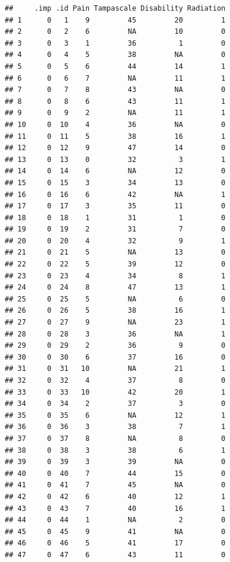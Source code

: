 \documentclass[]{book}
\begin{document}
\begin{verbatim}
##     .imp .id Pain Tampascale Disability Radiation
## 1      0   1    9         45         20         1
## 2      0   2    6         NA         10         0
## 3      0   3    1         36          1         0
## 4      0   4    5         38         NA         0
## 5      0   5    6         44         14         1
## 6      0   6    7         NA         11         1
## 7      0   7    8         43         NA         0
## 8      0   8    6         43         11         1
## 9      0   9    2         NA         11         1
## 10     0  10    4         36         NA         0
## 11     0  11    5         38         16         1
## 12     0  12    9         47         14         0
## 13     0  13    0         32          3         1
## 14     0  14    6         NA         12         0
## 15     0  15    3         34         13         0
## 16     0  16    6         42         NA         1
## 17     0  17    3         35         11         0
## 18     0  18    1         31          1         0
## 19     0  19    2         31          7         0
## 20     0  20    4         32          9         1
## 21     0  21    5         NA         13         0
## 22     0  22    5         39         12         0
## 23     0  23    4         34          8         1
## 24     0  24    8         47         13         1
## 25     0  25    5         NA          6         0
## 26     0  26    5         38         16         1
## 27     0  27    9         NA         23         1
## 28     0  28    3         36         NA         1
## 29     0  29    2         36          9         0
## 30     0  30    6         37         16         0
## 31     0  31   10         NA         21         1
## 32     0  32    4         37          8         0
## 33     0  33   10         42         20         1
## 34     0  34    2         37          3         0
## 35     0  35    6         NA         12         1
## 36     0  36    3         38          7         1
## 37     0  37    8         NA          8         0
## 38     0  38    3         38          6         1
## 39     0  39    3         39         NA         0
## 40     0  40    7         44         15         0
## 41     0  41    7         45         NA         0
## 42     0  42    6         40         12         1
## 43     0  43    7         40         16         1
## 44     0  44    1         NA          2         0
## 45     0  45    9         41         NA         0
## 46     0  46    5         41         17         0
## 47     0  47    6         43         11         0

\end{verbatim}
\end{document}
